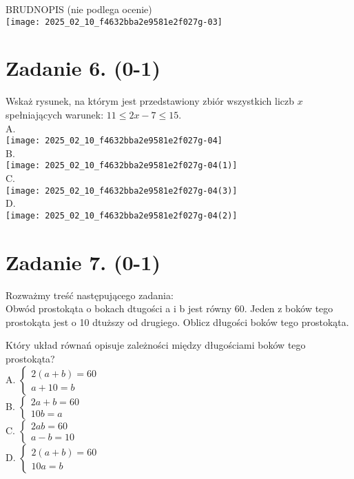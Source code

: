 \documentclass[10pt]{article}
\begin{document}
BRUDNOPIS (nie podlega ocenie)\\
\texttt{[image: 2025\_02\_10\_f4632bba2e9581e2f027g-03]}

\section*{Zadanie 6. (0-1)}
Wskaż rysunek, na którym jest przedstawiony zbiór wszystkich liczb \(x\) spełniających warunek: \(11 \leq 2 x-7 \leq 15\).\\
A.\\
\texttt{[image: 2025\_02\_10\_f4632bba2e9581e2f027g-04]}\\
B.\\
\texttt{[image: 2025\_02\_10\_f4632bba2e9581e2f027g-04(1)]}\\
C.\\
\texttt{[image: 2025\_02\_10\_f4632bba2e9581e2f027g-04(3)]}\\
D.\\
\texttt{[image: 2025\_02\_10\_f4632bba2e9581e2f027g-04(2)]}

\section*{Zadanie 7. (0-1)}
Rozważmy treść następującego zadania:\\
Obwód prostokąta o bokach dtugości a i b jest równy 60. Jeden z boków tego prostokąta jest o 10 dtuższy od drugiego. Oblicz długości boków tego prostokąta.

Który układ równań opisuje zależności między długościami boków tego prostokąta?\\
A. \(\left\{\begin{array}{l}2(a+b)=60 \\ a+10=b\end{array}\right.\)\\
B. \(\left\{\begin{array}{l}2 a+b=60 \\ 10 b=a\end{array}\right.\)\\
C. \(\left\{\begin{array}{l}2 a b=60 \\ a-b=10\end{array}\right.\)\\
D. \(\left\{\begin{array}{l}2(a+b)=60 \\ 10 a=b\end{array}\right.\)
\end{document}
